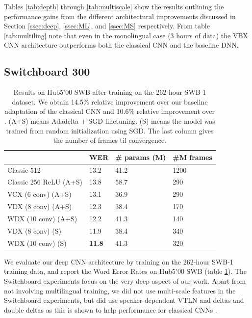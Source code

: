 \documentclass{article}
\begin{document}
Tables \ref{tab:depth} through \ref{tab:multiscale}
show the results outlining the performance gains from the different architectural improvements 
discussed in Section \ref{ssec:deep}, \ref{ssec:ML}, and \ref{ssec:MS} respectively.
From table \ref{tab:multiling} note that even in the monolingual case
(3 hours of data) the VBX CNN architecture outperforms both the classical CNN and the baseline DNN.

\subsection{Switchboard 300}
\label{ssec:swb}
\begin{table}[ht]
\centering
\begin{tabular}{| l | l | l | l |}
    \hline
    & WER &  \# params (M) & \#M frames\\ \hline
    Classic 512 \cite{soltau2014joint}      & 13.2  & 41.2 & 1200 \\
    \hline
    Classic 256 ReLU (A+S)                        & 13.8  & 58.7 & 290 \\
    VCX (6 conv) (A+S)                            & 13.1  & 36.9 & 290 \\
    VDX (8 conv) (A+S)                            & 12.3  & 38.4 & 170 \\ %
    WDX (10 conv) (A+S)                           & 12.2  & 41.3 & 140 \\ %
    \hline
    VDX (8 conv) (S)                        & 11.9  & 38.4 & 340 \\  %
    WDX (10 conv) (S)                       & \bf{11.8}  & 41.3 & 320 \\  %
    \hline
\end{tabular}
\caption{\label{tab:hub5}Results on Hub5'00 SWB after training on the 262-hour SWB-1 dataset.
    We obtain 14.5\% relative improvement
    over our baseline adaptation of the classical CNN
    and 10.6\% relative improvement over \cite{soltau2014joint}.
    (A+S) means Adadelta + SGD finetuning. 
    (S) means the model was trained from random initialization using SGD.
    The last column gives the number of frames til convergence.
}
\end{table}

We evaluate our deep CNN architecture by training on the 262-hour SWB-1 training data,
and report the Word Error Rates on Hub5'00 SWB (table \ref{tab:hub5}).
The Switchboard experiments focus on the very deep aspect of our work.
Apart from not involving multilingual training,
we did not use multi-scale features in the Switchboard experiments, 
but did use speaker-dependent VTLN and deltas and double deltas as this is shown to help
performance for classical CNNs \cite{sainath2013deep}.
\end{document}
